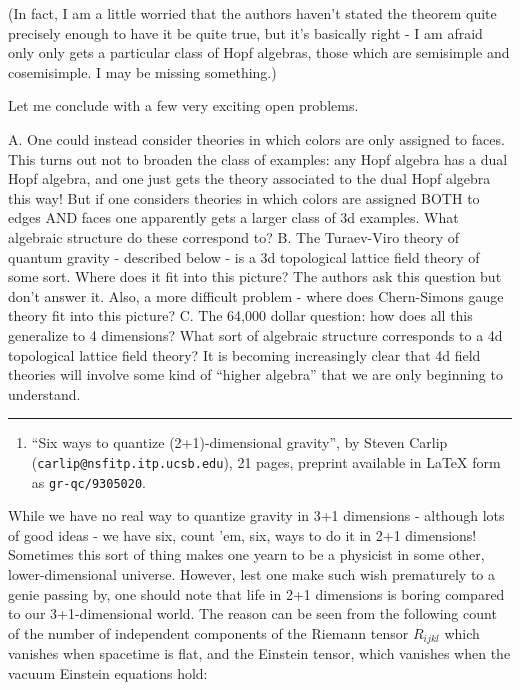\documentclass{article}
\def\tightlist{}
\begin{document}
(In fact, I am a little worried that the authors haven't stated the
theorem quite precisely enough to have it be quite true, but it's
basically right - I am afraid only only gets a particular class of Hopf
algebras, those which are semisimple and cosemisimple. I may be missing
something.)

Let me conclude with a few very exciting open problems.

A. One could instead consider theories in which colors are only assigned
to faces. This turns out not to broaden the class of examples: any Hopf
algebra has a dual Hopf algebra, and one just gets the theory associated
to the dual Hopf algebra this way! But if one considers theories in
which colors are assigned BOTH to edges AND faces one apparently gets a
larger class of 3d examples. What algebraic structure do these
correspond to? B. The Turaev-Viro theory of quantum gravity - described
below - is a 3d topological lattice field theory of some sort. Where
does it fit into this picture? The authors ask this question but don't
answer it. Also, a more difficult problem - where does Chern-Simons
gauge theory fit into this picture? C. The 64,000 dollar question: how
does all this generalize to 4 dimensions? What sort of algebraic
structure corresponds to a 4d topological lattice field theory? It is
becoming increasingly clear that 4d field theories will involve some
kind of ``higher algebra'' that we are only beginning to understand.

\begin{center}\rule{0.5\linewidth}{0.5pt}\end{center}

\begin{enumerate}
\def\labelenumi{\arabic{enumi})}
\setcounter{enumi}{3}
\tightlist
\item
  ``Six ways to quantize (2+1)-dimensional gravity'', by Steven Carlip
  (\texttt{carlip@nsfitp.itp.ucsb.edu}), 21 pages, preprint available in
  LaTeX form as \texttt{gr-qc/9305020}.
\end{enumerate}

While we have no real way to quantize gravity in 3+1 dimensions -
although lots of good ideas - we have six, count 'em, six, ways to do it
in 2+1 dimensions! Sometimes this sort of thing makes one yearn to be a
physicist in some other, lower-dimensional universe. However, lest one
make such wish prematurely to a genie passing by, one should note that
life in 2+1 dimensions is boring compared to our 3+1-dimensional world.
The reason can be seen from the following count of the number of
independent components of the Riemann tensor \(R_{ijkl}\) which vanishes
when spacetime is flat, and the Einstein tensor, which vanishes when the
vacuum Einstein equations hold:
\end{document}
